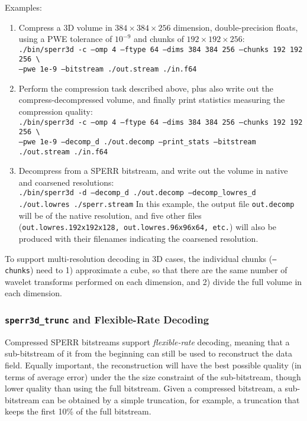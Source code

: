 \documentclass{article}
\newcommand{\callout}[1]{\begin{BlueBox}#1\end{BlueBox}}
\begin{document}
Examples:
\begin{enumerate}
\item Compress a 3D volume in $384\times384\times256$ dimension, double-precision floats,
      using a PWE tolerance of $10^{-9}$ and chunks of $192\times192\times256$: \\
      \texttt{./bin/sperr3d -c --omp 4 --ftype 64 --dims 384 384 256 --chunks 192 192 256 
      \textbackslash \\
      --pwe 1e-9 --bitstream ./out.stream ./in.f64}
\item Perform the compression task described above, plus also write out the 
      compress-decompressed volume, and finally print statistics
      measuring the compression quality: \\
       \texttt{./bin/sperr3d -c --omp 4 --ftype 64 --dims 384 384 256 --chunks 192 192 256 
       \textbackslash \\
       --pwe 1e-9 --decomp\_d ./out.decomp --print\_stats --bitstream ./out.stream ./in.f64}
\item Decompress from a SPERR bitstream, and write out the volume in native 
      and coarsened resolutions: \\
      \texttt{./bin/sperr3d -d --decomp\_d ./out.decomp --decomp\_lowres\_d ./out.lowres 
              ./sperr.stream}
      In this example, the output file \texttt{out.decomp} will be of the native resolution, 
      and five other files (\texttt{out.lowres.192x192x128, out.lowres.96x96x64, etc.}) 
      will also be produced with their filenames indicating the coarsened resolution.
\end{enumerate}

\callout{To support multi-resolution decoding in 3D cases, the individual chunks 
(\texttt{--chunks}) need to 1) approximate a cube, so that there are the same number
of wavelet transforms performed on each dimension, and 2) divide the full volume
in each dimension.}

\subsubsection{\texttt{sperr3d\_trunc} and Flexible-Rate Decoding}
Compressed SPERR bitstreams support \textit{flexible-rate} decoding, meaning that a
sub-bitstream of it from the beginning can still be used to reconstruct the data field.
Equally important, the reconstruction will have the best possible quality (in terms of
average error) under the the size constraint of the sub-bitstream, though lower quality
than using the full bitstream.
Given a compressed bitstream, a sub-bitstream can be obtained by a simple truncation,
for example, a truncation that keeps the first 10\% of the full bitstream.
\end{document}
